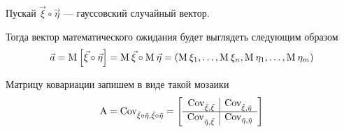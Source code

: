 Пускай $\vec{\xi} \circ \vec{\eta}$ --- гауссовский случайный вектор.

Тогда вектор математического ожидания будет выглядеть следующим образом
$$\vec{a}
    = \operatorname{M}_{} \left[ \vec{\xi} \circ \vec{\eta} \right]
    = \operatorname{M}_{} \vec{\xi} \circ \operatorname{M}_{} \vec{\eta}
    = \left( \operatorname{M}_{} \xi_1, \dots, \operatorname{M}_{} \xi_n,
        \operatorname{M}_{} \eta_1, \dots, \operatorname{M}_{} \eta_m \right)$$

Матрицу ковариации запишем в виде такой мозаики
\begin{equation}\label{eq:covMatrix:mozaik}
    \operatorname{A}
    = \operatorname{Cov^{}_{\vec{\xi} \circ \vec{\eta}, \vec{\xi} \circ \vec{\eta}}}
    = \left[ \begin{array}{r|l}
            \operatorname{Cov^{}_{\vec{\xi}, \vec{\xi}}} & \operatorname{Cov^{}_{\vec{\xi}, \vec{\eta}}} \\
            \hline
            \operatorname{Cov^{}_{\vec{\eta}, \vec{\xi}}} & \operatorname{Cov^{}_{\vec{\eta}, \vec{\eta}}} \\
        \end{array} \right]
\end{equation}

